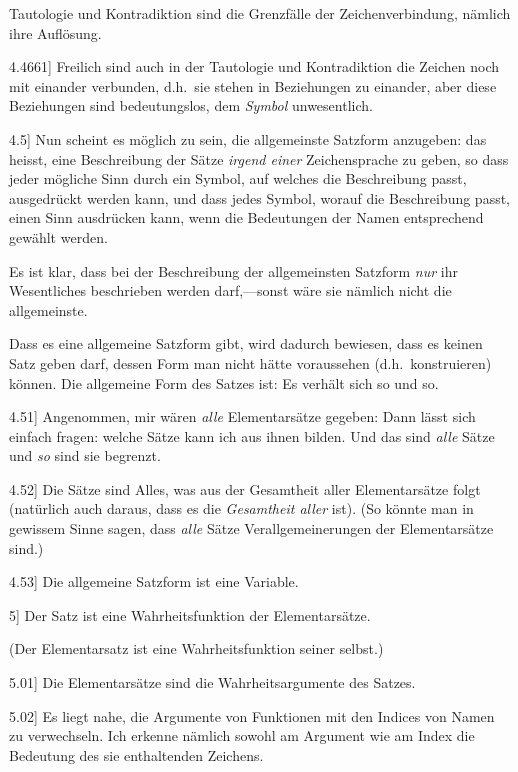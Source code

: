\documentclass[12pt,oneside]{book}[2007/10/19]
\newcommand{\PropERef}[1]{\hyperref[PropE:#1]{#1}}
\newcommand{\PropositionG}[2]{%
  \item[\phantomsection\label{PropG:#1}\PropERef{#1}] #2%
}
\newcommand{\Emph}[1]{\emph{#1}}%
\newcommand{\dasHeiszt}{d.\;h.}
\begin{document}
\begin{propositions}
{Tautologie und Kontradiktion sind die Grenzfälle
der Zeichenverbindung, nämlich ihre Auflösung.}


\PropositionG{4.4661}
{Freilich sind auch in der Tautologie und Kontradiktion
die Zeichen noch mit einander verbunden,
\dasHeiszt\ sie stehen in Beziehungen zu einander,
aber diese Beziehungen sind bedeutungslos, dem
\Emph{Symbol} unwesentlich.}


\PropositionG{4.5}
{Nun scheint es möglich zu sein, die allgemeinste
Satzform anzugeben: das heisst, eine Beschreibung
der Sätze \Emph{irgend einer} Zeichensprache zu geben,
so dass jeder mögliche Sinn durch ein Symbol,
auf welches die Beschreibung passt, ausgedrückt
werden kann, und dass jedes Symbol, worauf die
Beschreibung passt, einen Sinn ausdrücken kann,
wenn die Bedeutungen der Namen entsprechend
gewählt werden.

Es ist klar, dass bei der Beschreibung der
allgemeinsten Satzform \Emph{nur} ihr Wesentliches
beschrieben werden darf,---sonst wäre sie nämlich
nicht die allgemeinste.

Dass es eine allgemeine Satzform gibt, wird
dadurch bewiesen, dass es keinen Satz geben darf,
dessen Form man nicht hätte voraussehen (\dasHeiszt\ konstruieren)
können. Die allgemeine Form des
Satzes ist: Es verhält sich so und so.}


\PropositionG{4.51}
{Angenommen, mir wären \Emph{alle} Elementarsätze
gegeben: Dann lässt sich einfach fragen: welche
Sätze kann ich aus ihnen bilden. Und das sind
\Emph{alle} Sätze und \Emph{so} sind sie begrenzt.}


\PropositionG{4.52}
{Die Sätze sind Alles, was aus der Gesamtheit
aller Elementarsätze folgt (natürlich auch daraus,
dass es die \Emph{Gesamtheit aller} ist). (So könnte
man in gewissem Sinne sagen, dass \Emph{alle} Sätze
Verallgemeinerungen der Elementarsätze sind.)}


\PropositionG{4.53}
{Die allgemeine Satzform ist eine Variable.}


\PropositionG{5}
{Der Satz ist eine Wahrheitsfunktion der Elementarsätze.

(Der Elementarsatz ist eine Wahrheitsfunktion
seiner selbst.)}


\PropositionG{5.01}
{Die Elementarsätze sind die Wahrheitsargumente
des Satzes.}


\PropositionG{5.02}
{Es liegt nahe, die Argumente von Funktionen
mit den Indices von Namen zu verwechseln. Ich
erkenne nämlich sowohl am Argument wie am
Index die Bedeutung des sie enthaltenden Zeichens.

}
\end{propositions}
\end{document}
